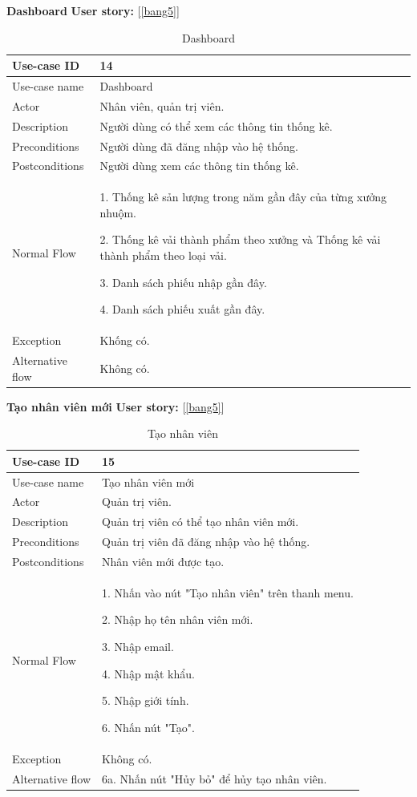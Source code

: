 \textbf{Dashboard}
\textbf{User story:} [\ref{bang5}]
\begin{table}[!htp]
    \centering
    \begin{tabular}{|m{3cm}|m{10cm}|}
    \hline 
        Use-case ID & 14\\ \hline
        Use-case name & Dashboard\\ \hline
        Actor & Nhân viên, quản trị viên.\\ \hline
        Description & Người dùng có thể xem các thông tin thống kê.\\ \hline
        Preconditions & Người dùng đã đăng nhập vào hệ thống.\\ \hline
        Postconditions & Người dùng xem các thông tin thống kê.\\ \hline
        Normal Flow & 
        1. Thống kê sản lượng trong năm gần đây của từng xưởng nhuộm.\par
        2. Thống kê vải thành phẩm theo xưởng và Thống kê vải thành phẩm theo loại vải.\par
        3. Danh sách phiếu nhập gần đây.\par
        4. Danh sách phiếu xuất gần đây.
        \\ \hline
        Exception & Khống có.\\ \hline
        Alternative flow & Không có.\\ 
    \hline 
    \end{tabular}
    \caption{Dashboard}
    \label{bang14}
\end{table}

\newpage
\textbf{Tạo nhân viên mới}
\textbf{User story:} [\ref{bang5}]
\begin{table}[!htp]
    \centering
    \begin{tabular}{|m{3cm}|m{10cm}|}
    \hline 
        Use-case ID & 15\\ \hline
        Use-case name & Tạo nhân viên mới\\ \hline
        Actor & Quản trị viên.\\ \hline
        Description & Quản trị viên có thể tạo nhân viên mới.\\ \hline
        Preconditions & Quản trị viên đã đăng nhập vào hệ thống.\\ \hline
        Postconditions & Nhân viên mới được tạo.\\ \hline
        Normal Flow & 
        1. Nhấn vào nút "Tạo nhân viên" trên thanh menu.\par 
        2. Nhập họ tên nhân viên mới.\par
        3. Nhập email.\par
        4. Nhập mật khẩu.\par
        5. Nhập giới tính.\par
        6. Nhấn nút "Tạo".
        \\ \hline
        Exception & Không có.
        \\ \hline
        Alternative flow & 
        6a. Nhấn nút "Hủy bỏ" để hủy tạo nhân viên.
        \\ 
    \hline 
    \end{tabular}
    \caption{Tạo nhân viên}
    \label{bang15}
\end{table}

